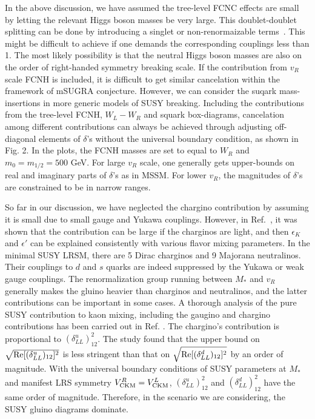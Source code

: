 \documentclass[prd,aps,preprint,tightenlines,superscriptaddress]{revtex4}
\begin{document}
In the above discussion, we have assumed the tree-level FCNC effects are small by letting the relevant Higgs boson
masses be very large. This doublet-doublet splitting can be done by introducing a singlet or non-renormaizable terms~\cite{Mohapatra:2008gz}. This might be difficult to achieve if one demands the corresponding couplings less  than 1. The most likely possibility is that the neutral Higgs boson masses are also on the order of right-handed symmetry breaking scale. If the contribution from $v_R$ scale FCNH is included, it is difficult to get similar cancelation within the framework of mSUGRA conjecture. However, we can consider the suqark mass-insertions 
in more generic models of SUSY breaking. Including the contributions from the tree-level FCNH, $W_L-W_R$ and squark box-diagrams, cancelation among different contributions can always be achieved through adjusting off-diagonal elements of $\delta$'s without the universal boundary condition, as shown in Fig. 2. In the plots, the FCNH masses are set to equal to $W_R$ and $m_0= m_{1/2}=500$ GeV. For large $v_R$ scale, one generally gets 
upper-bounds on real and imaginary parts of $\delta$'s as in MSSM. For lower $v_R$, the magnitudes 
of $\delta$'s are constrained to be in narrow ranges.

So far in our discussion, we have neglected the chargino contribution by assuming it is small due to small
gauge and Yukawa couplings. However, in Ref.~\cite{Khalil:2001wr}, it was shown that the contribution can be
large if the charginos are light, and then $\epsilon_K$ and $\epsilon'$ can be explained consistently
with various flavor mixing parameters. In the minimal SUSY LRSM, there are
5 Dirac charginos and 9 Majorana neutralinos. Their couplings to $d$ and $s$ quarks are indeed
suppressed by the Yukawa or weak gauge couplings. The renormalization group running between $M_*$ and $v_R$
generally makes the gluino heavier than  charginos and neutralinos, and the latter contributions can
be important in some cases. A thorough analysis
of the pure SUSY contribution to kaon mixing, including the gaugino and chargino contributions has been
carried out in Ref. \cite{Frank:2003yi}. The chargino's contribution is proportional to
$(\delta^u_{LL})_{12}^2$. The study found that the upper bound on $\sqrt{{\rm Re}[(\delta_{LL}^{u})_{12}]^2}$ is less stringent than that on $\sqrt{{\rm Re}[(\delta_{LL}^{d})_{12}]^2}$ by an order of magnitude. With
the universal boundary conditions of SUSY parameters at $M_*$ and manifest LRS symmetry $V^R_{\rm CKM} = V^L_{\rm CKM}$, $(\delta_{LL}^{u})_{12}^2$ and $(\delta_{LL}^{d})_{12}^2$ have the same order of magnitude.
Therefore, in the scenario we are considering, the SUSY gluino diagrams dominate.
\end{document}
